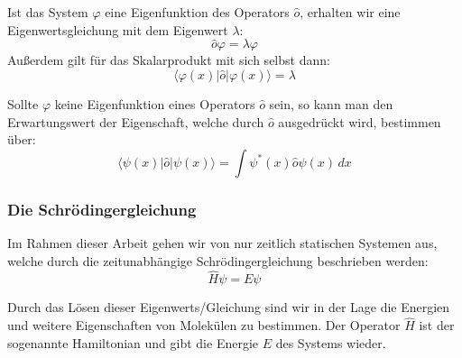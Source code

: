 Ist das System $\varphi$ eine Eigenfunktion des Operators $\hat{o}$,
erhalten wir eine Eigenwertsgleichung mit dem Eigenwert $\lambda$:
\begin{equation}
    \hat{o} \varphi = \lambda \varphi
\end{equation}
Außerdem gilt für das Skalarprodukt mit sich selbst dann:
\begin{equation}
    \langle \varphi(x) \vert \hat{o} \vert \varphi(x) \rangle = \lambda
\end{equation}


Sollte $\varphi$ keine Eigenfunktion eines Operators $\hat{o}$ sein,
so kann man den Erwartungswert der Eigenschaft, welche durch $\hat{o}$ ausgedrückt wird, bestimmen über:
\begin{equation}
\langle \psi(x) \vert \hat{o} \vert \psi(x) \rangle
  = \int \psi^*(x) \hat{o} \psi(x) \,dx
\end{equation}

\cite[S. 21]{atkins_friedman_2011}
\cite[S. 155-156]{levine_2019}

\subsubsection{Die Schrödingergleichung}
Im Rahmen dieser Arbeit gehen wir von nur zeitlich statischen Systemen aus,
welche durch die zeitunabhängige Schrödingergleichung beschrieben werden:
\begin{equation}\label{schroedinger}
  \hat{H}\psi = E\psi
\end{equation}

Durch das Lösen dieser Eigenwerts\-/Gleichung sind wir in der Lage
die Energien und weitere Eigenschaften von Molekülen zu bestimmen.
Der Operator $\hat{H}$ ist der sogenannte Hamiltonian und
gibt die Energie $E$ des Systems wieder.

\cite[S. 24-25]{atkins_friedman_2011}